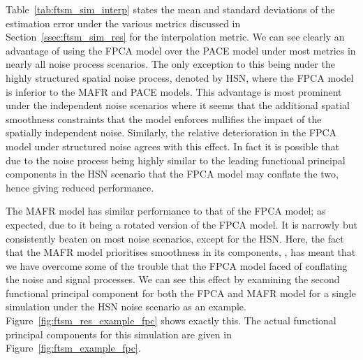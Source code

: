 Table~\ref{tab:ftsm_sim_interp} states the mean and standard deviations of the estimation error under the various metrics discussed in Section~\ref{ssec:ftsm_sim_res} for the interpolation metric.
We can see clearly an advantage of using the FPCA model over the PACE model under most metrics in nearly all noise process scenarios.
The only exception to this being nuder the highly structured spatial noise process, denoted by HSN, where the FPCA model is inferior to the MAFR and PACE models. 
This advantage is most prominent under the independent noise scenarios where it seems that the additional spatial smoothness constraints that the model enforces nullifies the impact of the spatially independent noise.
Similarly, the relative deterioration in the FPCA model under structured noise agrees with this effect.
In fact it is possible that due to the noise process being highly similar to the leading functional principal components in the HSN scenario that the FPCA model may conflate the two, hence giving reduced performance.

The MAFR model has similar performance to that of the FPCA model; as expected, due to it being a rotated version of the FPCA model.
It is narrowly but consistently beaten on most noise scenarios, except for the HSN.
Here, the fact that the MAFR model prioritises smoothness in its components, \citep{hooker_maximal_2016}, has meant that we have overcome some of the trouble that the FPCA model faced of conflating the noise and signal processes. 
We can see this effect by examining the second functional principal component for both the FPCA and MAFR model for a single simulation under the HSN noise scenario as an example.
Figure~\ref{fig:ftsm_res_example_fpc} shows exactly this.
The actual functional principal components for this simulation are given in Figure~\ref{fig:ftsm_example_fpc}.

